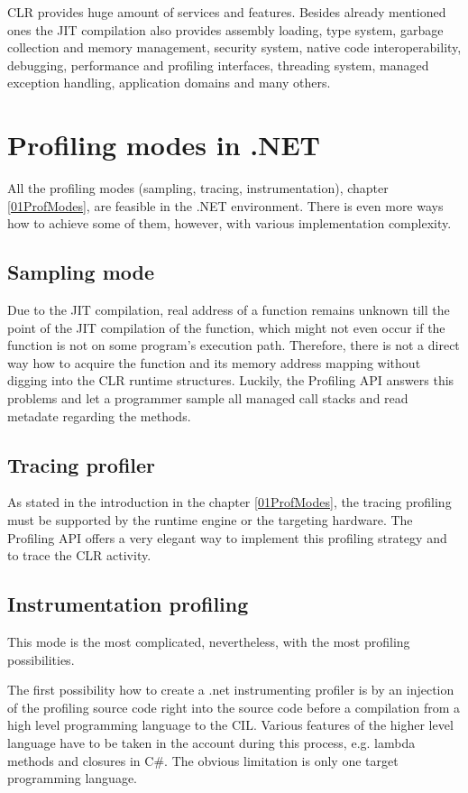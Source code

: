 CLR provides huge amount of services and features. Besides already mentioned ones the JIT compilation also provides assembly loading, type system, garbage collection and memory management, security system, native code interoperability, debugging, performance and profiling interfaces, threading system, managed exception handling, application domains and many others.

\section{Profiling modes in .NET}
All the profiling modes (sampling, tracing, instrumentation), chapter \ref{01ProfModes}, are feasible in the .NET environment. There is even more ways how to achieve some of them, however, with various implementation complexity. 

\subsection{Sampling mode}
Due to the JIT compilation, real address of a function remains unknown till the point of the JIT compilation of the function, which might not even occur if the function is not on some program's execution path. Therefore, there is not a direct way how to acquire the function and its memory address mapping without digging into the CLR runtime structures. Luckily, the Profiling API answers this problems and let a programmer sample all managed call stacks and read metadate regarding the methods.

\subsection{Tracing profiler}
As stated in the introduction in the chapter \ref{01ProfModes}, the tracing profiling must be supported by the runtime engine or the targeting hardware. The Profiling API offers a very elegant way to implement this profiling strategy and to trace the CLR activity.

\subsection{Instrumentation profiling}
This mode is the most complicated, nevertheless, with the most profiling possibilities. 

The first possibility how to create a .net instrumenting profiler is by an injection of the profiling source code right into the source code before a compilation from a high level programming language to the CIL. Various features of the higher level language have to be taken in the account during this process, e.g. lambda methods and closures in C\#. The obvious limitation is only one target programming language.

